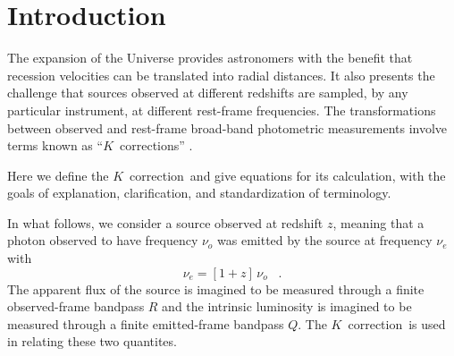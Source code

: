 \documentclass[preprint]{aastex}
\newcommand{\kcorrection}{$K$~correction}
\newcommand{\kcorrections}{{\kcorrection}s}
\newcommand{\nuobs}{\nu_o}
\newcommand{\nuemit}{\nu_e}
\begin{document}
\title{\scalebox{1.5}{The \kcorrection}}
\author{
  David W. Hogg,
  Ivan K. Baldry,
  Michael R. Blanton,
  and
  Daniel J. Eisenstein
}

\begin{abstract}
The \kcorrection\ ``corrects'' for the fact that sources observed at
different redshifts are, in general, compared with standards or each
other at different rest-frame wavelengths.  It is part of the relation
between the emitted- or rest-frame absolute magnitude of a source in
one broad photometric bandpass to the observed-frame apparent
magnitude of the same source in another broad bandpass.  This short
pedagogical paper provides definitions of and equations for the
\kcorrection.
\end{abstract}

\section{Introduction}

The expansion of the Universe provides astronomers with the benefit
that recession velocities can be translated into radial distances.  It
also presents the challenge that sources observed at different
redshifts are sampled, by any particular instrument, at different
rest-frame frequencies.  The transformations between observed and
rest-frame broad-band photometric measurements involve terms known as
``\kcorrections'' \citep*{humason56a, oke68a}.

Here we define the \kcorrection\ and give equations for its
calculation, with the goals of explanation, clarification, and
standardization of terminology.

In what follows, we consider a source observed at redshift $z$,
meaning that a photon observed to have frequency $\nuobs$ was emitted
by the source at frequency $\nuemit$ with
\begin{equation}
\nuemit = [1+z]\,\nuobs \;\;\;.
\end{equation}
The apparent flux of the source is imagined to be measured through a
finite observed-frame bandpass $R$ and the intrinsic luminosity is
imagined to be measured through a finite emitted-frame bandpass $Q$.
The \kcorrection\ is used in relating these two quantites.
\end{document}
